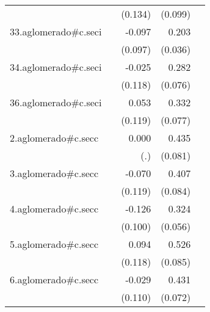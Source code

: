 {\begin{longtable}{l*{4}{D{.}{.}{-1}}}
            &                     &     (0.134)         &     (0.099)         &                     \\
\addlinespace
33.aglomerado#c.seci&                     &      -0.097         &       0.203\sym{***}&                     \\
            &                     &     (0.097)         &     (0.036)         &                     \\
\addlinespace
34.aglomerado#c.seci&                     &      -0.025         &       0.282\sym{***}&                     \\
            &                     &     (0.118)         &     (0.076)         &                     \\
\addlinespace
36.aglomerado#c.seci&                     &       0.053         &       0.332\sym{***}&                     \\
            &                     &     (0.119)         &     (0.077)         &                     \\
\addlinespace
2.aglomerado#c.secc&                     &       0.000         &       0.435\sym{***}&                     \\
            &                     &         (.)         &     (0.081)         &                     \\
\addlinespace
3.aglomerado#c.secc&                     &      -0.070         &       0.407\sym{***}&                     \\
            &                     &     (0.119)         &     (0.084)         &                     \\
\addlinespace
4.aglomerado#c.secc&                     &      -0.126         &       0.324\sym{***}&                     \\
            &                     &     (0.100)         &     (0.056)         &                     \\
\addlinespace
5.aglomerado#c.secc&                     &       0.094         &       0.526\sym{***}&                     \\
            &                     &     (0.118)         &     (0.085)         &                     \\
\addlinespace
6.aglomerado#c.secc&                     &      -0.029         &       0.431\sym{***}&                     \\
            &                     &     (0.110)         &     (0.072)         &                     \\

\end{longtable}}
